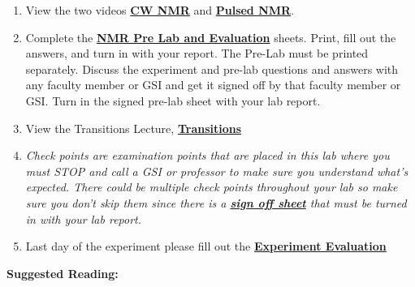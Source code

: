 \documentclass{../lab}
\begin{document}
\begin{enumerate}
    \item View the two videos \href{http://youtu.be/q\_Rtbr7YEJY}{\textbf{CW NMR}} and \href{http://youtu.be/\_sXDn-ChOUY}{\textbf{Pulsed NMR}}.

    \item Complete the \href{http://experimentationlab.berkeley.edu/NMRPreLab}{\textbf{NMR Pre Lab and Evaluation}} sheets. Print, fill out the answers, and turn in with your report. The Pre-Lab must be printed separately. Discuss the experiment and pre-lab questions and answers with any faculty member or GSI and get it signed off by that faculty member or GSI. Turn in the signed pre-lab sheet with your lab report.

    \item View the Transitions Lecture, \href{http://youtu.be/xOMgdVP3AfE}{\textbf{Transitions}}

    \item \emph{Check points are examination points that are placed in this lab where you must STOP and call a GSI or professor to make sure you understand what's expected. There could  be multiple check points throughout your lab so make sure you don't skip them since there is a \href{http://experimentationlab.berkeley.edu/nmrcheckpoints}{\textbf{sign off sheet}} that must be turned in with your lab report.}

    \item Last day of the experiment please fill out the \href{\ExperimentEvaluation}{\textbf{Experiment Evaluation}}

\end{enumerate}

\textbf{Suggested Reading:}
\end{document}
